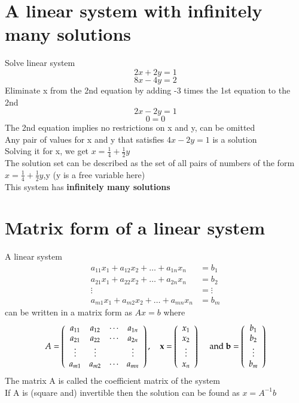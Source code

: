\documentclass{article}[18pt]
\begin{document}
\section{A linear system with infinitely many solutions}
Solve linear system
$$2x+2y=1$$
$$8x-4y=2$$
Eliminate x from the 2nd equation by adding -3 times the 1st equation to the 2nd
$$2x-2y=1$$
$$0=0$$
The 2nd equation implies no restrictions on x and y, can be omitted\\
Any pair of values for x and y that satisfies $4x-2y=1$ is a solution\\
Solving it for x, we get $x=\frac{1}{4}+\frac{1}{2}y$\\
The solution set can be described as the set of all pairs of numbers of the form $x=\frac{1}{4}+\frac{1}{2}y$,y (y is a free variable here)\\
This system has \textbf{infinitely many solutions}
\section{Matrix form of a linear system}
A linear system
$$\begin{aligned} a _ { 11 } x _ { 1 } + a _ { 12 } x _ { 2 } + \ldots + a _ { 1 n } x _ { n } & = b _ { 1 } \\ a _ { 21 } x _ { 1 } + a _ { 22 } x _ { 2 } + \ldots + a _ { 2 n } x _ { n } & = b _ { 2 } \\ \vdots & = \vdots \\ a _ { m 1 } x _ { 1 } + a _ { m 2 } x _ { 2 } + \ldots + a _ { m n } x _ { n } & = b _ { m } \end{aligned}$$
can be written in a matrix form as $Ax=b$ where
$$A = \left( \begin{array} { c c c c } { a _ { 11 } } & { a _ { 12 } } & { \cdots } & { a _ { 1 n } } \\ { a _ { 21 } } & { a _ { 22 } } & { \cdots } & { a _ { 2 n } } \\ { \vdots } & { \vdots } & { } & { \vdots } \\ { a _ { m 1 } } & { a _ { m 2 } } & { \cdots } & { a _ { m n } } \end{array} \right) , \quad \mathbf { x } = \left( \begin{array} { c } { x _ { 1 } } \\ { x _ { 2 } } \\ { \vdots } \\ { x _ { n } } \end{array} \right) \quad \text { and } \mathbf { b } = \left( \begin{array} { c } { b _ { 1 } } \\ { b _ { 2 } } \\ { \vdots } \\ { b _ { m } } \end{array} \right)$$
The matrix A is called the coefficient matrix of the system\\
If A is (square and) invertible then the solution can be found as $x=A^{-1}b$
\end{document}
